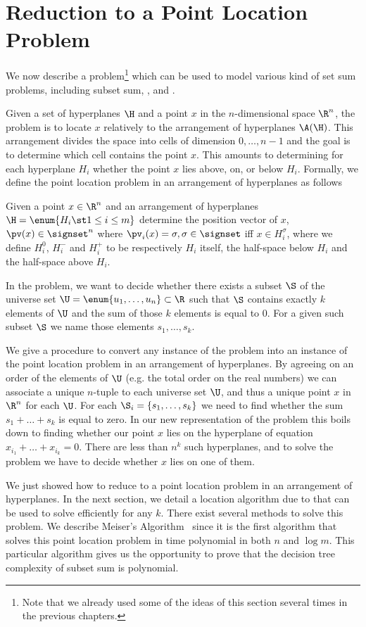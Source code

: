 \section{Reduction to a Point Location Problem}

We now describe a problem\footnote{%
Note that we already used some of the ideas of this section several times in
the previous chapters.%
}
which can be used to model
various kind of set sum problems, including subset sum, \kSUM, and \kLDT.

Given a set of hyperplanes \(\H\) and a point \(x\) in the \(n\)-dimensional
space \(\R^n\), the problem is to locate \(x\) relatively
to the arrangement of hyperplanes \(\A(\H)\). This arrangement divides the space
into cells of dimension \(0,\ldots,n-1\) and the goal is to determine which
cell contains the point \(x\). This amounts to determining for each
hyperplane \(H_i\) whether the point \(x\) lies above, on, or below \(H_i\).
Formally, we define the point location problem in an arrangement of hyperplanes as
follows
\begin{problem}
Given a point $x \in \R^n$ and an arrangement of hyperplanes $\H = \enum{ H_i
\st 1 \leq i \leq m }$ determine the position vector of $x$, $\pv(x) \in
\signset^n$ where $\pv_i(x) = \sigma, \sigma \in \signset$ iff $x \in
H_i^{\sigma}$, where we define $H_i^{0}$, $H_i^{-}$ and $H_i^{+}$ to be
respectively $H_i$ itself, the half-space below $H_i$ and the half-space above
$H_i$.
\end{problem}
In the \kSUM problem, we want to decide whether there exists a subset \(\S\) of the
universe set \(\U = \enum{u_1,\ldots,u_n} \subset \R\) such that
$\S$
contains exactly $k$ elements of $\U$ and the sum of those $k$
elements is equal to $0$. For a given such subset $\S$ we name those elements
$s_1, \dots, s_k$.

We give a procedure to convert any instance of the \kSUM problem into an
instance of the point location problem in an arrangement of hyperplanes.
By agreeing on an order of the elements of $\U$ (e.g. the total order on
the real numbers) we can associate a unique $n$-tuple to each universe set $\U$,
and thus a unique point $x$ in $\R^n$ for each $\U$.
For each $\S_i = \left\{s_1, \dots, s_k\right\}$ we need to find whether the sum $s_1
+ \dots + s_k$ is equal to zero. In our new representation of the problem this
boils down to finding whether our point $x$ lies on the hyperplane of
equation $x_{i_1} + \dots + x_{i_k} = 0$. There are less than $n^k$ such
hyperplanes, and to solve the problem
we have to decide whether \(x\) lies on one of them.

We just showed how to reduce \kSUM to a
point location problem in an arrangement of hyperplanes. In the next section,
we detail a location algorithm due to \citet*{meiser:1993} that can be used to
solve \kSUM efficiently for any $k$. There exist several methods to solve
this problem. We describe Meiser's Algorithm~\cite{meiser:1993} since it
is the first algorithm that solves this point location problem in time
polynomial in both $n$ and $\log m$. This particular
algorithm gives us the opportunity to prove that the decision tree complexity
of subset sum is polynomial.

